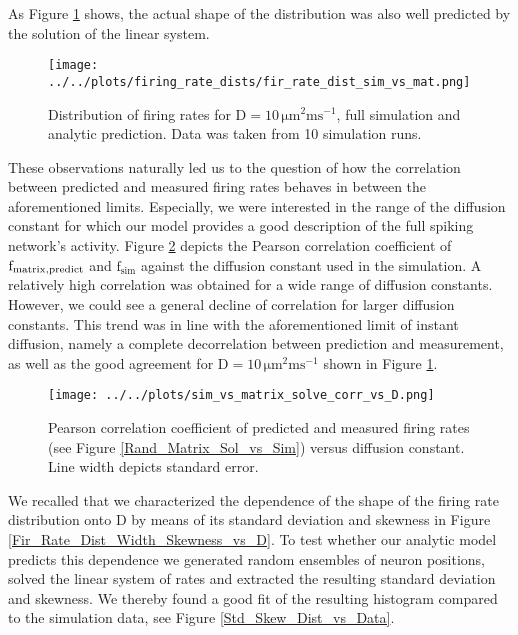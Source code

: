 \documentclass[10pt,a4paper]{article}
\begin{document}
As Figure \ref{Fir_Rate_Dist_Sim_vs_Mat} shows, the actual shape of the distribution was also well predicted by the solution of the linear system.
\begin{figure}
\begin{center}
\texttt{[image: ../../plots/firing\_rate\_dists/fir\_rate\_dist\_sim\_vs\_mat.png]}
\end{center}
\caption{Distribution of firing rates for $\mathrm{D=10\, \mu m^2 ms^{-1}}$, full simulation and analytic prediction. Data was taken from 10 simulation runs.}
\label{Fir_Rate_Dist_Sim_vs_Mat}
\end{figure}
These observations naturally led us to the question of how the correlation between predicted and measured firing rates behaves in between the aforementioned limits. Especially, we were interested in the range of the diffusion constant for which our model provides a good description of the full spiking network's activity. Figure \ref{Corr_Coeff_vs_D} depicts the Pearson correlation coefficient of $\mathrm{f_{matrix \\, predict}}$ and $\mathrm{f_{sim}}$ against the diffusion constant used in the simulation. A relatively high correlation was obtained for a wide range of diffusion constants. However, we could see a general decline of correlation for larger diffusion constants. This trend was in line with the aforementioned limit of instant diffusion, namely a complete decorrelation between prediction and measurement, as well as the good agreement for $\mathrm{D= 10\, \mu m^2 ms^{-1}}$ shown in Figure \ref{Fir_Rate_Dist_Sim_vs_Mat}.
\begin{figure}
\begin{center}
\texttt{[image: ../../plots/sim\_vs\_matrix\_solve\_corr\_vs\_D.png]}
\end{center}
\caption{Pearson correlation coefficient of predicted and measured firing rates (see Figure \ref{Rand_Matrix_Sol_vs_Sim}) versus diffusion constant. Line width depicts standard error.}
\label{Corr_Coeff_vs_D}
\end{figure}
We recalled that we characterized the dependence of the shape of the firing rate distribution onto $\mathrm{D}$ by means of its standard deviation and skewness in Figure \ref{Fir_Rate_Dist_Width_Skewness_vs_D}. To test whether our analytic model predicts this dependence we generated random ensembles of neuron positions, solved the linear system of rates and extracted the resulting standard deviation and skewness. We thereby found a good fit of the resulting histogram compared to the simulation data, see Figure \ref{Std_Skew_Dist_vs_Data}.
\end{document}
